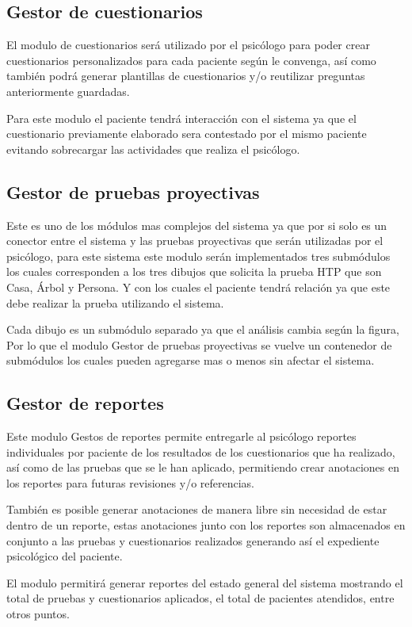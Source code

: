 \subsection{Gestor de cuestionarios}
El modulo de cuestionarios será utilizado por el psicólogo para poder crear cuestionarios personalizados para cada paciente según le convenga, así como también podrá generar plantillas de cuestionarios y/o reutilizar preguntas anteriormente guardadas.

Para este modulo el paciente tendrá interacción con el sistema ya que el cuestionario previamente elaborado sera contestado por el mismo paciente evitando sobrecargar las actividades que realiza el psicólogo.
\newline
\subsection{Gestor de pruebas proyectivas}
Este es uno de los módulos mas complejos del sistema ya que por si solo es un conector entre el sistema y las pruebas proyectivas que serán utilizadas por el psicólogo, para este sistema este modulo serán implementados tres submódulos los cuales corresponden a los tres dibujos que solicita la prueba HTP que son Casa, Árbol y Persona. Y con los cuales el paciente tendrá relación ya que este debe realizar la prueba utilizando el sistema.

Cada dibujo es un submódulo separado ya que el análisis cambia según la figura, Por lo que el modulo Gestor de pruebas proyectivas se vuelve un contenedor de submódulos los cuales pueden agregarse mas o menos sin afectar el sistema.
\newline
\subsection{Gestor de reportes}
Este modulo Gestos de reportes permite entregarle al psicólogo reportes individuales por paciente de los resultados de los cuestionarios que ha realizado, así como de las pruebas que se le han aplicado, permitiendo crear anotaciones en los reportes para futuras revisiones y/o referencias.

También es posible generar anotaciones de manera libre sin necesidad de estar dentro de un reporte, estas anotaciones junto con los reportes son almacenados en conjunto a las pruebas y cuestionarios realizados generando así el expediente psicológico del paciente.

El modulo permitirá generar reportes del estado general del sistema mostrando el total de pruebas y cuestionarios aplicados, el total de pacientes atendidos, entre otros puntos.
\newline